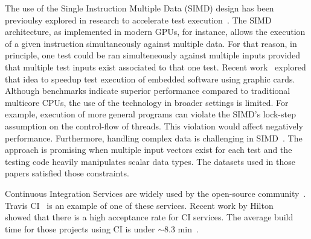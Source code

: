 The use of the Single Instruction Multiple Data (SIMD) design has been
previoulsy explored in research to accelerate test
execution~\cite{damorim-etal-issta2007,damorim-etal-tse2008,kim-etal-issre2012,nguyen-etal-icse2014,rajan-etal-ase2014,sen-etal-fse2015,yaneva-etal-issta2017}. The
SIMD architecture, as implemented in modern GPUs, for instance, allows
the execution of a given instruction simultaneously against multiple
data.  For that reason, in principle, one test could be ran
simulteneously against multiple inputs provided that multiple test
inputs exist associated to that one test.  Recent
work~\cite{rajan-etal-ase2014,yaneva-etal-issta2017} explored that
idea to speedup test execution of embedded software using graphic
cards. Although benchmarks indicate superior performance compared to
traditional multicore CPUs, the use of the technology in broader
settings is limited. For example, execution of more general programs
can violate the SIMD's lock-step assumption on the control-flow of
threads.  This violation would affect negatively performance.
Furthermore, handling complex data is challenging in
SIMD~\cite{damorim-etal-issta2007,damorim-etal-tse2008}.  The approach
is promising when multiple input vectors exist for each test and the
testing code heavily manipulates scalar data types.  The datasets used
in those papers satisfied those constraints.




Continuous Integration Services are widely used by the open-source
community~\cite{hilton-etal-ase2016,vasilescu-etal-fse2015}. Travis
CI~\cite{travis} is an example of one of these services. Recent work
by Hilton~\etal{}~\cite{hilton-etal-ase2016} showed that there is a
high acceptance rate for CI services. The average build time for those
projects using CI is under $\sim$8.3 min~\cite{hilton-etal-ase2016}. 


